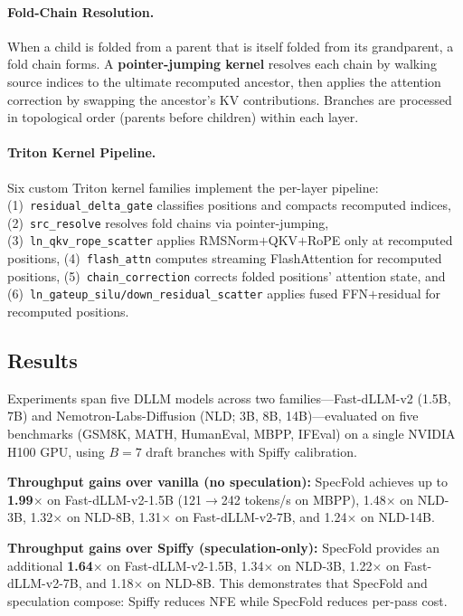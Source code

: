 \documentclass[11pt,a4paper]{article}
\begin{document}
\paragraph{Fold-Chain Resolution.} When a child is folded from a parent that is itself folded from its grandparent, a fold chain forms. A \textbf{pointer-jumping kernel} resolves each chain by walking source indices to the ultimate recomputed ancestor, then applies the attention correction by swapping the ancestor's KV contributions. Branches are processed in topological order (parents before children) within each layer.

\paragraph{Triton Kernel Pipeline.} Six custom Triton kernel families implement the per-layer pipeline: (1)~\texttt{residual\_delta\_gate} classifies positions and compacts recomputed indices, (2)~\texttt{src\_resolve} resolves fold chains via pointer-jumping, (3)~\texttt{ln\_qkv\_rope\_scatter} applies RMSNorm$+$QKV$+$RoPE only at recomputed positions, (4)~\texttt{flash\_attn} computes streaming FlashAttention for recomputed positions, (5)~\texttt{chain\_correction} corrects folded positions' attention state, and (6)~\texttt{ln\_gateup\_silu/down\_residual\_scatter} applies fused FFN$+$residual for recomputed positions.

\subsection{Results}
Experiments span five DLLM models across two families---Fast-dLLM-v2 (1.5B, 7B) and Nemotron-Labs-Diffusion (NLD; 3B, 8B, 14B)---evaluated on five benchmarks (GSM8K, MATH, HumanEval, MBPP, IFEval) on a single NVIDIA H100 GPU, using $B{=}7$ draft branches with Spiffy calibration.

\textbf{Throughput gains over vanilla (no speculation):} SpecFold achieves up to \textbf{1.99$\times$} on Fast-dLLM-v2-1.5B (121$\to$242 tokens/s on MBPP), 1.48$\times$ on NLD-3B, 1.32$\times$ on NLD-8B, 1.31$\times$ on Fast-dLLM-v2-7B, and 1.24$\times$ on NLD-14B.

\textbf{Throughput gains over Spiffy (speculation-only):} SpecFold provides an additional \textbf{1.64$\times$} on Fast-dLLM-v2-1.5B, 1.34$\times$ on NLD-3B, 1.22$\times$ on Fast-dLLM-v2-7B, and 1.18$\times$ on NLD-8B. This demonstrates that SpecFold and speculation compose: Spiffy reduces NFE while SpecFold reduces per-pass cost.
\end{document}
